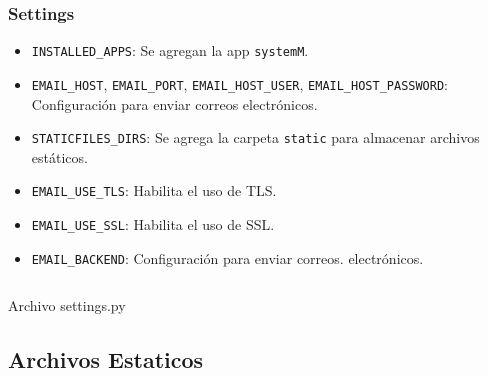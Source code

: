 \documentclass{article}
\newenvironment{block}{\captionsetup{type=listing}}{}
\begin{document}
\subsubsection{Settings}
\begin{itemize}
	\item \texttt{INSTALLED\_APPS}: Se agregan la app \texttt{systemM}.
	\item \texttt{EMAIL\_HOST}, \texttt{EMAIL\_PORT}, \texttt{EMAIL\_HOST\_USER}, \texttt{EMAIL\_HOST\_PASSWORD}: Configuración para enviar correos electrónicos.
	\item \texttt{STATICFILES\_DIRS}: Se agrega la carpeta \texttt{static} para almacenar archivos estáticos.
	\item \texttt{EMAIL\_USE\_TLS}: Habilita el uso de TLS.
	\item \texttt{EMAIL\_USE\_SSL}: Habilita el uso de SSL.
	\item \texttt{EMAIL\_BACKEND}: Configuración para enviar correos. electrónicos.
\end{itemize}
\begin{block}
	\inputminted{python}{../Course_Management_System/system/settings.py}
	\caption{Archivo settings.py}
\end{block}

\subsection{Archivos Estaticos}
\end{document}
